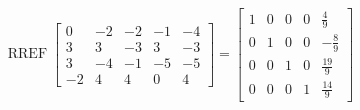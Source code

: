 \begin{exerciseAnswer} 


\[\operatorname{RREF} \left[\begin{array}{ccccc}
0 & -2 & -2 & -1 & -4 \\
3 & 3 & -3 & 3 & -3 \\
3 & -4 & -1 & -5 & -5 \\
-2 & 4 & 4 & 0 & 4
\end{array}\right] = \left[\begin{array}{ccccc}
1 & 0 & 0 & 0 & \frac{4}{9} \\
0 & 1 & 0 & 0 & -\frac{8}{9} \\
0 & 0 & 1 & 0 & \frac{19}{9} \\
0 & 0 & 0 & 1 & \frac{14}{9}
\end{array}\right] \]



\end{exerciseAnswer}
